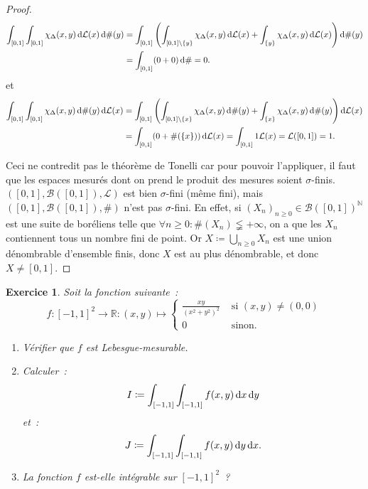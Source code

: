 \documentclass{article}
\newtheorem{ex}{Exercice}[section]
\theoremstyle{definition}
\newcommand{\pinfty}{{+\infty}}
\newcommand{\N}{{\mathbb N}}
\newcommand{\R}{{\mathbb R}}
\begin{document}
\begin{proof}
\begin{align*}
	\int_{[0, 1]}\int_{[0, 1]}\chi_\Delta(x, y)\dif\mathcal L(x)\dif\#(y)
		&= \int_{[0, 1]}\left(\int_{[0, 1] \setminus \{y\}}\chi_\Delta(x,y)\dif\mathcal L(x) + \int_{\{y\}}\chi_\Delta(x, y)\dif\mathcal L(x)\right)\dif\#(y) \\
		&= \int_{[0, 1]}(0 + 0)\dif\# = 0.
\end{align*}
et
\begin{align*}
	\int_{[0, 1]}\int_{[0, 1]}\chi_\Delta(x,y)\dif\#(y)\dif\mathcal L(x)
		&= \int_{[0, 1]}\left(\int_{[0, 1] \setminus \{x\}}\chi_\Delta(x, y)\dif\#(y) + \int_{\{x\}}\chi_\Delta(x,y)\dif\#(y)\right)\dif\mathcal L(x) \\
		&= \int_{[0, 1]}(0 + \#(\{x\}))\dif\mathcal L(x) = \int_{[0, 1]}1\mathcal L(x) = \mathcal L([0, 1]) = 1.
\end{align*}

Ceci ne contredit pas le théorème de Tonelli car pour pouvoir l'appliquer, il faut que les espaces mesurés dont on prend le produit des mesures soient $\sigma$-finis.
$([0, 1], \mathcal B([0, 1]), \mathcal L)$ est bien $\sigma$-fini (même fini), mais $([0, 1], \mathcal B([0, 1]), \#)$ n'est pas $\sigma$-fini.
En effet, si $(X_n)_{n \geq 0} \in \mathcal B([0, 1])^\N$ est une suite de boréliens telle que $\forall n \geq 0 : \#(X_n) \lneqq \pinfty$, on a que les $X_n$ contiennent
tous un nombre fini de point. Or $X \coloneqq \bigcup_{n \geq 0}X_n$ est une union dénombrable d'ensemble finis, donc $X$ est au plus dénombrable, et donc $X \neq [0, 1]$.
\end{proof}

\begin{ex} Soit la fonction suivante~:
\[f : [-1, 1]^2 \to \R : (x, y) \mapsto \begin{cases}\frac {xy}{(x^2+y^2)^2} &\text{ si } (x, y) \neq (0, 0) \\0 &\text{ sinon.}\end{cases}\]
\begin{enumerate}
	\item Vérifier que $f$ est Lebesgue-mesurable.
	\item Calculer~:
	\[I \coloneqq \int_{[-1, 1]}\int_{[-1, 1]}f(x, y)\dif x\dif y\]
	et~:
	\[J \coloneqq \int_{[-1, 1]}\int_{[-1, 1]}f(x, y)\dif y\dif x.\]
	\item La fonction $f$ est-elle intégrable sur $[-1, 1]^2$~?
\end{enumerate}
\end{ex}
\end{document}
